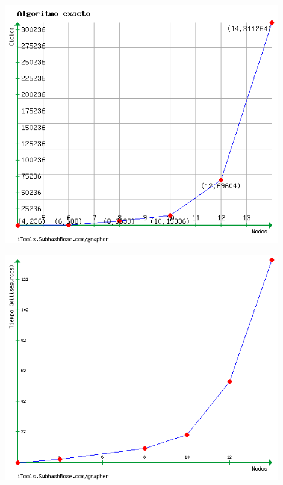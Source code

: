 \begin {center}
\includegraphics[width=12cm]{./graficos/exacto.png}
\end {center} 

\begin {center}
\includegraphics[width=12cm]{./graficos/exactoConTiempo.png}
\end {center}
